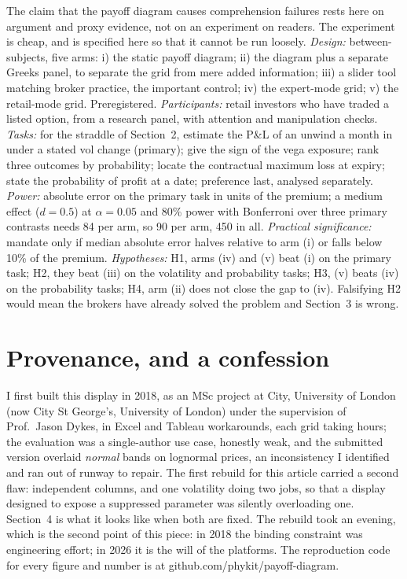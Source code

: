 \documentclass[11pt,a4paper]{article}
\newcommand{\PnL}{P\&L}
\begin{document}
\noindent The claim that the payoff diagram causes comprehension failures rests here on argument and proxy evidence, not on an experiment on readers. The experiment is cheap, and is specified here so that it cannot be run loosely. \emph{Design:} between-subjects, five arms: i) the static payoff diagram; ii) the diagram plus a separate Greeks panel, to separate the grid from mere added information; iii) a slider tool matching broker practice, the important control; iv) the expert-mode grid; v) the retail-mode grid. Preregistered. \emph{Participants:} retail investors who have traded a listed option, from a research panel, with attention and manipulation checks. \emph{Tasks:} for the straddle of Section~2, estimate the \PnL{} of an unwind a month in under a stated vol change (primary); give the sign of the vega exposure; rank three outcomes by probability; locate the contractual maximum loss at expiry; state the probability of profit at a date; preference last, analysed separately. \emph{Power:} absolute error on the primary task in units of the premium; a medium effect ($d = 0.5$) at $\alpha = 0.05$ and 80\% power with Bonferroni over three primary contrasts needs 84 per arm, so 90 per arm, 450 in all. \emph{Practical significance:} mandate only if median absolute error halves relative to arm (i) or falls below 10\% of the premium. \emph{Hypotheses:} H1, arms (iv) and (v) beat (i) on the primary task; H2, they beat (iii) on the volatility and probability tasks; H3, (v) beats (iv) on the probability tasks; H4, arm (ii) does not close the gap to (iv). Falsifying H2 would mean the brokers have already solved the problem and Section~3 is wrong.

\section{Provenance, and a confession}

\noindent I first built this display in 2018, as an MSc project at City, University of London (now City St George's, University of London) under the supervision of Prof.\ Jason Dykes, in Excel and Tableau workarounds, each grid taking hours; the evaluation was a single-author use case, honestly weak, and the submitted version overlaid \emph{normal} bands on lognormal prices, an inconsistency I identified and ran out of runway to repair. The first rebuild for this article carried a second flaw: independent columns, and one volatility doing two jobs, so that a display designed to expose a suppressed parameter was silently overloading one. Section~4 is what it looks like when both are fixed. The rebuild took an evening, which is the second point of this piece: in 2018 the binding constraint was engineering effort; in 2026 it is the will of the platforms. The reproduction code for every figure and number is at github.com/phykit/payoff-diagram.
\end{document}
